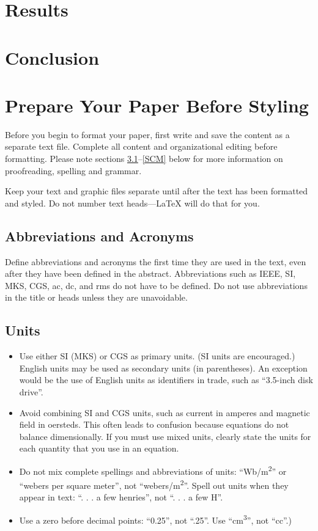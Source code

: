 \documentclass[conference]{IEEEtran}
\begin{document}
\section{Results}

\section{Conclusion}


\section{Prepare Your Paper Before Styling}
Before you begin to format your paper, first write and save the content as a 
separate text file. Complete all content and organizational editing before 
formatting. Please note sections \ref{AA}--\ref{SCM} below for more information on 
proofreading, spelling and grammar.

Keep your text and graphic files separate until after the text has been 
formatted and styled. Do not number text heads---{\LaTeX} will do that 
for you.

\subsection{Abbreviations and Acronyms}\label{AA}
Define abbreviations and acronyms the first time they are used in the text, 
even after they have been defined in the abstract. Abbreviations such as 
IEEE, SI, MKS, CGS, ac, dc, and rms do not have to be defined. Do not use 
abbreviations in the title or heads unless they are unavoidable.

\subsection{Units}
\begin{itemize}
\item Use either SI (MKS) or CGS as primary units. (SI units are encouraged.) English units may be used as secondary units (in parentheses). An exception would be the use of English units as identifiers in trade, such as ``3.5-inch disk drive''.
\item Avoid combining SI and CGS units, such as current in amperes and magnetic field in oersteds. This often leads to confusion because equations do not balance dimensionally. If you must use mixed units, clearly state the units for each quantity that you use in an equation.
\item Do not mix complete spellings and abbreviations of units: ``Wb/m\textsuperscript{2}'' or ``webers per square meter'', not ``webers/m\textsuperscript{2}''. Spell out units when they appear in text: ``. . . a few henries'', not ``. . . a few H''.
\item Use a zero before decimal points: ``0.25'', not ``.25''. Use ``cm\textsuperscript{3}'', not ``cc''.)
\end{itemize}
\end{document}
